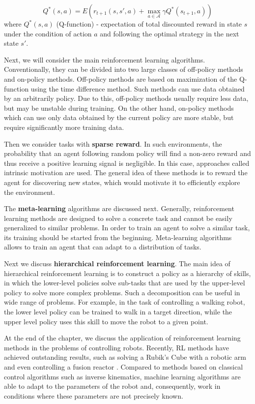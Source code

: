\[
	Q^*(s, a) = E(r_{t + 1}(s, s', a) + \max_{a \in \mathcal{A}} \gamma Q^*(s_{t + 1}, a))
\]
where $Q^*(s, a)$ (Q-function) - expectation of total discounted reward in state $s$ under the condition of action $a$ and following the optimal strategy in the next state $s'$.

Next, we will consider the main reinforcement learning algorithms. Conventionally, they can be divided into two large classes of off-policy methods and on-policy methods. Off-policy methods are based on maximization of the Q-function using the time difference method. Such methods can use data obtained by an arbitrarily policy. Due to this, off-policy methods usually require less data, but may be unstable during training. On the other hand, on-policy methods which can use only data obtained by the current policy are more stable, but require significantly more training data. 

Then we consider tasks with \textbf{sparse reward}. In such environments, the probability that an agent following random policy will find a non-zero reward and thus receive a positive learning signal is negligible. In this case, approaches called intrinsic motivation are used. The general idea of these methods is to reward the agent for discovering new states, which would motivate it to efficiently explore the environment.

The \textbf{meta-learning} algorithms are discussed next. Generally, reinforcement learning methods are designed to solve a concrete task and cannot be easily generalized to similar problems. In order to train an agent to solve a similar task, its training should be started from the beginning. Meta-learning algorithms allows to train an agent that can adapt to a distribution of tasks. 

Next we discuss \textbf{hierarchical reinforcement learning}. The main idea of hierarchical reinforcement learning is to construct a policy as a hierarchy of skills, in which the lower-level policies solve sub-tasks that are used by the upper-level policy to solve more complex problems. Such a decomposition can be useful in wide range of problems. For example, in the task of controlling a walking robot, the lower level policy can be trained to walk in a target direction, while the upper level policy uses this skill to move the robot to a given point.

At the end of the chapter, we discuss the application of reinforcement learning methods in the problems of controlling robots. Recently, RL methods have achieved outstanding results, such as solving a Rubik's Cube with a robotic arm \cite{rubic} and even controlling a fusion reactor \cite{tokomak}. Compared to methods based on classical control algorithms such as inverse kinematics, machine learning algorithms are able to adapt to the parameters of the robot and, consequently, work in conditions where these parameters are not precisely known.


